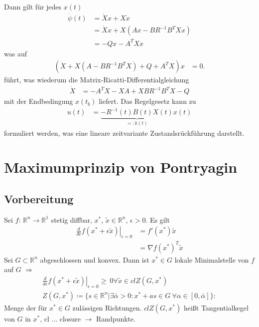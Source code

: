 Dann gilt für jedes $x(t)$
\begin{align*}
	\dot{\psi}(t) & = \dot{X}x + X\dot{x}\\
	& = \dot{X}x + X\left(Ax-BR^{-1}B^TXx \right)\\
	& = -Qx-A^TXx
\end{align*}
was auf
\begin{align*}
	\left(\dot{X} + X\left(A-BR^{-1}B^TX \right) + Q +A^TX \right)x & = 0.
\end{align*}
führt, was wiederum die Matrix-Ricatti-Differentialgleichung
\begin{align*}
	\dot{X} & = -A^TX -XA + XBR^{-1}B^TX -Q
\end{align*}
mit der Endbedingung $x(t_b)$ liefert. Das Regelgesetz kann zu
\begin{align*}
	u(t) & = \underbrace{-R^{-1}(t)B(t)X(t)}_{=:k(t)}x(t)
\end{align*}
formuliert werden, was eine lineare zeitvariante Zustandsrückführung darstellt.

\section{Maximumprinzip von Pontryagin}
\subsection{Vorbereitung}
Sei $f$: $\mathbb{R}^n \rightarrow \mathbb{R}^1$ stetig diffbar, $x^{\ast}$, $\tilde{x}\in \mathbb{R}^n$, $\epsilon > 0$. Es gilt 
\begin{align*}
\left. \frac{d}{d\epsilon}f(x^{\ast} + \epsilon \tilde{x})\right|_{\epsilon=0} &= f'(x^{\ast})\tilde{x} \\
&= \nabla f(x^{\ast})^T \tilde{x}
\end{align*}
Sei $G \subset \mathbb{R}^n$ abgeschlossen und konvex. Dann ist $x^{\ast} \in G$ lokale Minimalstelle von $f$ auf $G$ $\Rightarrow$
\begin{align*}
\left. \frac{d}{d\epsilon}f(x^{\ast} + \epsilon \tilde{x})\right|_{\epsilon=0} \ge \: 0 \forall \tilde{x} \in cl Z(G,x^{\ast}) \\
Z(G,x^{\ast}) \coloneqq \{s \in \mathbb{R}^n | \exists \bar{\alpha}>0: x^{\ast} + as \in G \: \forall \alpha \in [0, \bar{\alpha}]\}:
\end{align*}
Menge der für $x^{\ast}\in G$ zulässigen Richtungen. $cl Z(G,x^{\ast})$ heißt Tangentialkegel von $G$ in $x^{\ast}$, cl ... closure $\rightarrow$ Randpunkte. 

